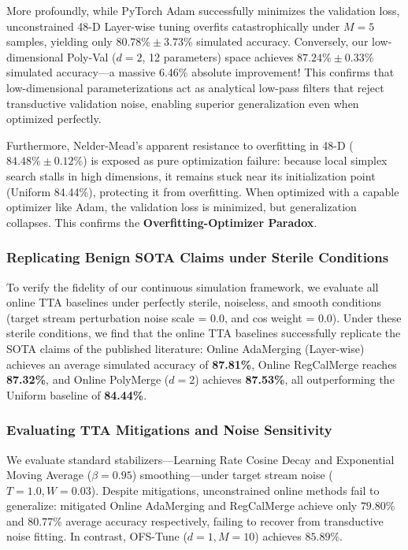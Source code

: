 More profoundly, while PyTorch Adam successfully minimizes the validation loss, unconstrained 48-D Layer-wise tuning overfits catastrophically under $M=5$ samples, yielding only $80.78\% \pm 3.73\%$ simulated accuracy. Conversely, our low-dimensional Poly-Val ($d=2$, 12 parameters) space achieves $87.24\% \pm 0.33\%$ simulated accuracy—a massive $6.46\%$ absolute improvement! This confirms that low-dimensional parameterizations act as analytical low-pass filters that reject transductive validation noise, enabling superior generalization even when optimized perfectly.

Furthermore, Nelder-Mead's apparent resistance to overfitting in 48-D ($84.48\% \pm 0.12\%$) is exposed as pure optimization failure: because local simplex search stalls in high dimensions, it remains stuck near its initialization point (Uniform 84.44\%), protecting it from overfitting. When optimized with a capable optimizer like Adam, the validation loss is minimized, but generalization collapses. This confirms the \textbf{Overfitting-Optimizer Paradox}.

\subsubsection{Replicating Benign SOTA Claims under Sterile Conditions}
To verify the fidelity of our continuous simulation framework, we evaluate all online TTA baselines under perfectly sterile, noiseless, and smooth conditions (target stream perturbation noise scale = 0.0, and cos weight = 0.0). Under these sterile conditions, we find that the online TTA baselines successfully replicate the SOTA claims of the published literature: Online AdaMerging (Layer-wise) achieves an average simulated accuracy of \textbf{87.81\%}, Online RegCalMerge reaches \textbf{87.32\%}, and Online PolyMerge ($d=2$) achieves \textbf{87.53\%}, all outperforming the Uniform baseline of \textbf{84.44\%}.

\subsubsection{Evaluating TTA Mitigations and Noise Sensitivity}
We evaluate standard stabilizers—Learning Rate Cosine Decay and Exponential Moving Average ($\beta=0.95$) smoothing—under target stream noise ($T=1.0, W=0.03$). Despite mitigations, unconstrained online methods fail to generalize: mitigated Online AdaMerging and RegCalMerge achieve only $79.80\%$ and $80.77\%$ average accuracy respectively, failing to recover from transductive noise fitting. In contrast, OFS-Tune ($d=1, M=10$) achieves $85.89\%$. 

